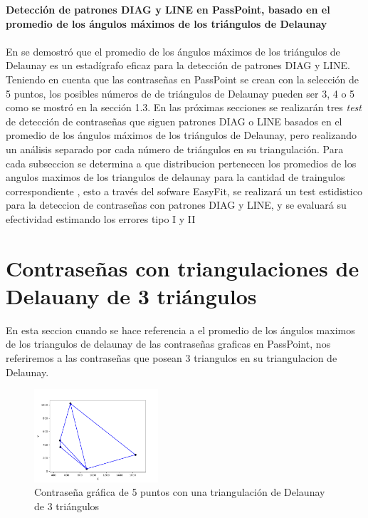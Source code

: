 \documentclass[12pt]{report}
\begin{document}
\vspace{-2em} %

\noindent\textbf{\LARGE Detección de patrones DIAG y LINE en PassPoint, basado en el promedio de los ángulos máximos de los triángulos de Delaunay}\\
\vspace{2em}
\\	
En \cite{13} se demostró que el promedio de los ángulos máximos de los triángulos de Delaunay es un estadígrafo eficaz para la detección de patrones DIAG y LINE. Teniendo en cuenta que las contraseñas en PassPoint se crean con la selección de 5 puntos, los posibles números de  de triángulos de Delaunay pueden ser 3, 4 o 5 como se mostró en la sección 1.3. En las próximas secciones se realizarán tres \textit{test} de detección de contraseñas  que siguen patrones DIAG o LINE basados en el promedio de los ángulos  máximos de los triángulos de Delaunay, pero  realizando un análisis separado por cada número de triángulos en su triangulación.
Para  cada subseccion se determina a que distribucion pertenecen los promedios de los angulos maximos de los triangulos de delaunay para la cantidad de traingulos correspondiente , esto a través  del sofware EasyFit, se realizará un test estidistico para la deteccion de contraseñas con patrones DIAG y LINE, y se evaluará su efectividad estimando los errores tipo I y II 
\setcounter{section}{0}
\setcounter{figure}{2.0}
\section{Contraseñas con triangulaciones de Delauany de 3 triángulos }
En esta seccion cuando se hace referencia  a el promedio de los ángulos maximos de los triangulos de delaunay  de las contraseñas graficas en PassPoint, nos referiremos a las contraseñas que posean 3 triangulos en su triangulacion de Delaunay.
	\begin{figure}[ht]
	\centering
	
	\includegraphics[width=0.41\textwidth]{alea3td.png}
	\caption{Contraseña gráfica de 5 puntos con una triangulación de Delaunay de 3 triángulos}
	\label{3TD}
\end{figure}
\end{document}
